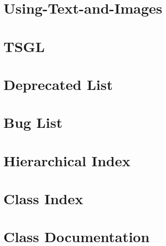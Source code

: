 \documentclass[twoside]{book}
\begin{document}
\chapter{Using-\/\-Text-\/and-\/\-Images}
\label{md__home_kodemonkey_workspace__t_s_g_l_docs-wiki__using-_text-and-_images}
\hypertarget{md__home_kodemonkey_workspace__t_s_g_l_docs-wiki__using-_text-and-_images}{}

\chapter{T\-S\-G\-L}
\label{md__home_kodemonkey_workspace__t_s_g_l_readme}
\hypertarget{md__home_kodemonkey_workspace__t_s_g_l_readme}{}

\chapter{Deprecated List}
\label{deprecated}
\hypertarget{deprecated}{}

\chapter{Bug List}
\label{bug}
\hypertarget{bug}{}

\chapter{Hierarchical Index}

\chapter{Class Index}

\chapter{Class Documentation}





































\newpage
{}
{}
\printindex
\end{document}
